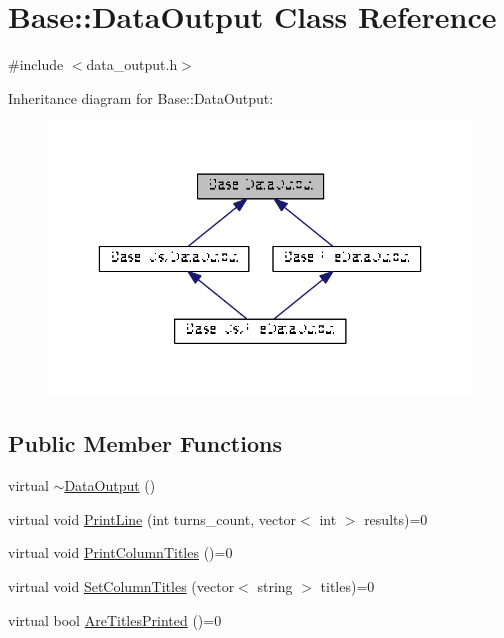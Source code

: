 \hypertarget{classBase_1_1DataOutput}{\section{Base\-:\-:Data\-Output Class Reference}
\label{classBase_1_1DataOutput}
}


{\ttfamily \#include $<$data\-\_\-output.\-h$>$}



Inheritance diagram for Base\-:\-:Data\-Output\-:\nopagebreak
\begin{figure}[H]
\begin{center}
\leavevmode
\includegraphics[width=329pt]{classBase_1_1DataOutput__inherit__graph}
\end{center}
\end{figure}
\subsection*{Public Member Functions}
\begin{DoxyCompactItemize}
\item 
virtual \hyperlink{classBase_1_1DataOutput_afbf4de9aafb25ccc5a9a1565b29565ec}{$\sim$\-Data\-Output} ()
\item 
virtual void \hyperlink{classBase_1_1DataOutput_afdb91464e7559dedf69c56c1b862a216}{Print\-Line} (int turns\-\_\-count, vector$<$ int $>$ results)=0
\item 
virtual void \hyperlink{classBase_1_1DataOutput_a0f1a6127945492d692629120575e7f82}{Print\-Column\-Titles} ()=0
\item 
virtual void \hyperlink{classBase_1_1DataOutput_a368f0c022e828cd3f29085e10e70b113}{Set\-Column\-Titles} (vector$<$ string $>$ titles)=0
\item 
virtual bool \hyperlink{classBase_1_1DataOutput_aa201a3a18e148803cc3384af60acda60}{Are\-Titles\-Printed} ()=0
\end{DoxyCompactItemize}
